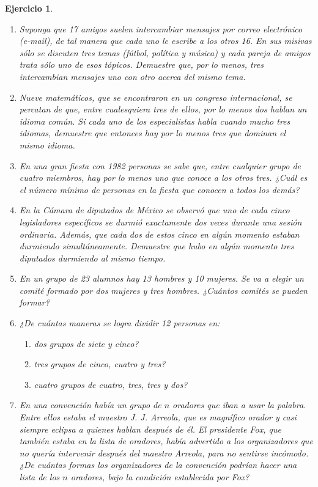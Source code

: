 \documentclass[12pt,twoside]{article}
\newtheorem{Ejer}{Ejercicio}
\begin{document}
\begin{Ejer}
\begin{enumerate}
\item Suponga que 17 amigos suelen intercambiar mensajes por correo electrónico (e-mail), de tal manera que cada uno le escribe a los otros 16. En sus misivas sólo se discuten tres temas (fútbol, política y música) y cada pareja de amigos trata sólo uno de esos tópicos. Demuestre que, por lo menos, tres intercambian mensajes uno con otro acerca del mismo tema.

\item Nueve matemáticos, que se encontraron en un congreso internacional, se percatan de que, entre cualesquiera tres de ellos, por lo menos dos hablan un idioma común. Si cada uno de los especialistas habla cuando mucho tres idiomas, demuestre que entonces hay por lo menos tres que dominan el mismo idioma.

\item En una gran fiesta con 1982 personas se sabe que, entre cualquier grupo de cuatro miembros, hay por lo menos uno que conoce a los otros tres. ¿Cuál es el número mínimo de personas en la fiesta que conocen a todos los demás?

\item En la Cámara de diputados de México se observó que uno de cada cinco legisladores específicos se durmió exactamente dos veces durante una sesión ordinaria. Además, que cada dos de estos cinco en algún momento estaban durmiendo simultáneamente. Demuestre que hubo en algún momento tres diputados durmiendo al mismo tiempo.

\item En un grupo de 23 alumnos hay 13 hombres y 10 mujeres. Se va a elegir un comité formado por dos mujeres y tres hombres. ¿Cuántos comités se pueden formar?

\item ¿De cuántas maneras se logra dividir 12 personas en:
\begin{enumerate}
\item dos grupos de siete y cinco?
\item tres grupos de cinco, cuatro y tres?
\item cuatro grupos de cuatro, tres, tres y dos?
\end{enumerate}

\item En una convención había un grupo de $n$ oradores que iban a usar la palabra. Entre ellos estaba el maestro J. J. Arreola, que es magnífico orador y casi siempre eclipsa a quienes hablan después de él. El presidente Fox, que también estaba en la lista de oradores, había advertido a los organizadores que no quería intervenir después del maestro Arreola, para no sentirse incómodo. ¿De cuántas formas los organizadores de la convención podrían hacer una lista de los $n$ oradores, bajo la condición establecida por Fox?


\end{enumerate}
\end{Ejer}
\end{document}
